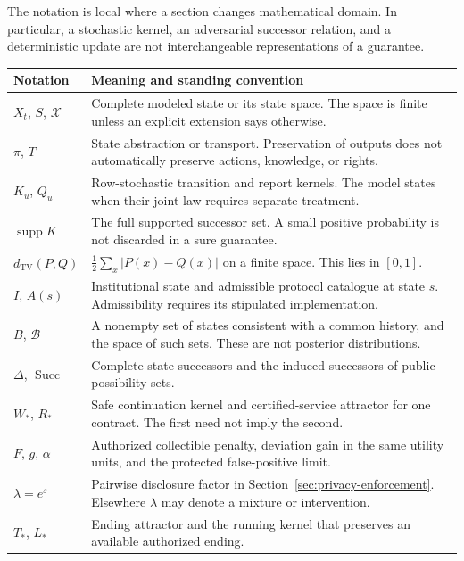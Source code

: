\documentclass[11pt,letterpaper]{article}
\theoremstyle{plain}
\theoremstyle{definition}
\theoremstyle{remark}
\newcommand{\TV}{d_{\mathrm{TV}}}
\begin{document}
The notation is local where a section changes mathematical domain. In particular, a stochastic kernel, an adversarial successor relation, and a deterministic update are not interchangeable representations of a guarantee.

\begin{center}\small
\begin{tabularx}{\textwidth}{@{}p{}X@{}}
\toprule
Notation & Meaning and standing convention\\
\midrule
$X_t$, $S$, $\mathcal X$ & Complete modeled state or its state space. The space is finite unless an explicit extension says otherwise.\\
$\pi$, $T$ & State abstraction or transport. Preservation of outputs does not automatically preserve actions, knowledge, or rights.\\
$K_u$, $Q_u$ & Row-stochastic transition and report kernels. The model states when their joint law requires separate treatment.\\
$\operatorname{supp}K$ & The full supported successor set. A small positive probability is not discarded in a sure guarantee.\\
$\TV(P,Q)$ & $\tfrac12\sum_x|P(x)-Q(x)|$ on a finite space. This lies in $[0,1]$.\\
$I$, $A(s)$ & Institutional state and admissible protocol catalogue at state $s$. Admissibility requires its stipulated implementation.\\
$B$, $\mathcal B$ & A nonempty set of states consistent with a common history, and the space of such sets. These are not posterior distributions.\\
$\Delta$, $\operatorname{Succ}$ & Complete-state successors and the induced successors of public possibility sets.\\
$W_*$, $R_*$ & Safe continuation kernel and certified-service attractor for one contract. The first need not imply the second.\\
$F$, $g$, $\alpha$ & Authorized collectible penalty, deviation gain in the same utility units, and the protected false-positive limit.\\
$\lambda=e^\varepsilon$ & Pairwise disclosure factor in Section~\ref{sec:privacy-enforcement}. Elsewhere $\lambda$ may denote a mixture or intervention.\\
$T_*$, $L_*$ & Ending attractor and the running kernel that preserves an available authorized ending.\\
\bottomrule
\end{tabularx}
\end{center}
\end{document}
